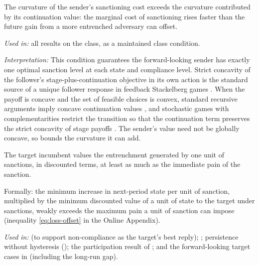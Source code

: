 \begin{assumption}[Concavity]
\label{ass:sender-concavity}
The curvature of the sender's sanctioning cost exceeds the curvature contributed by
its continuation value: the marginal cost of sanctioning rises faster than the future
gain from a more entrenched adversary can offset.
\end{assumption}
\noindent\textit{Used in:} all results on the class, as a maintained class
condition.\par
\noindent\textit{Interpretation:} This condition guarantees the forward-looking sender has exactly one optimal sanction level at each state and compliance level.
Strict concavity of the follower's stage-plus-continuation objective in its own action
is the standard source of a unique follower response in feedback Stackelberg games
\citep[Remark~7.5]{basar1999}. When the payoff is concave and the set of feasible
choices is convex, standard recursive arguments imply concave continuation values \citep[Thm.~4.8]{StokeyLucas1989}, and stochastic
games with complementarities restrict the transition so that the continuation term
preserves the strict concavity of stage payoffs \citep[Thm.~4.1]{Curtat1996}. The
sender's value need not be globally concave, so  bounds the
curvature it can add.

\begin{assumption}
\label{ass:loss-offset}
The target incumbent values the entrenchment generated by one unit of sanctions, in
discounted terms, at least as much as the immediate pain of the sanction.
\end{assumption}
\noindent Formally: the minimum increase in next-period state per unit of sanction,
multiplied by the minimum discounted value of a unit of state to the target under
sanctions, weakly exceeds the maximum pain a unit of sanction can impose (inequality \eqref{eq:loss-offset} in the Online Appendix).\par
\noindent\textit{Used in:}  (to support non-compliance as
the target's best reply); ; persistence without
hysteresis (); the participation result of
; and the forward-looking target cases in
 (including the long-run gap).


